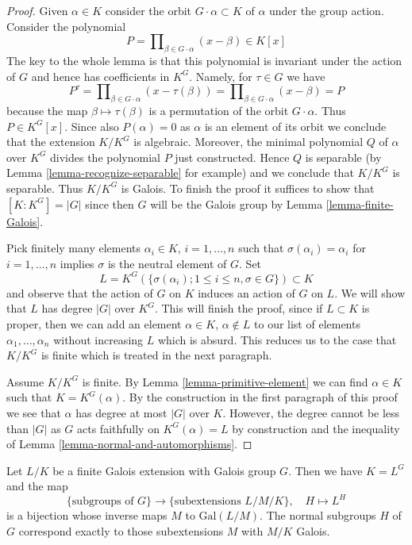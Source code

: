 \begin{proof}
Given $\alpha \in K$ consider the orbit $G \cdot \alpha \subset K$
of $\alpha$ under the group action. Consider the polynomial
$$
P = \prod\nolimits_{\beta \in G \cdot \alpha} (x - \beta) \in K[x]
$$
The key to the whole lemma is that this polynomial is invariant
under the action of $G$ and hence has coefficients in $K^G$.
Namely, for $\tau \in G$ we have
$$
P^\tau = \prod\nolimits_{\beta \in G \cdot \alpha} (x - \tau(\beta)) =
\prod\nolimits_{\beta \in G \cdot \alpha} (x - \beta) = P
$$
because the map $\beta \mapsto \tau(\beta)$ is a permutation of
the orbit $G \cdot \alpha$. Thus $P \in K^G[x]$. Since also
$P(\alpha) = 0$ as $\alpha$ is an element of its orbit
we conclude that the extension $K/K^G$ is algebraic. Moreover,
the minimal polynomial $Q$ of $\alpha$ over $K^G$ divides the
polynomial $P$ just constructed. Hence $Q$ is separable
(by Lemma \ref{lemma-recognize-separable} for example) and
we conclude that $K/K^G$ is separable. Thus $K/K^G$ is Galois.
To finish the proof it suffices to show that $[K : K^G] = |G|$
since then $G$ will be the Galois group by
Lemma \ref{lemma-finite-Galois}.

\medskip\noindent
Pick finitely many elements $\alpha_i \in K$, $i = 1, \ldots, n$
such that $\sigma(\alpha_i) = \alpha_i$ for $i = 1, \ldots, n$ implies
$\sigma$ is the neutral element of $G$. Set
$$
L = K^G(\{\sigma(\alpha_i); 1 \leq i \leq n, \sigma \in G\}) \subset K
$$
and observe that the action of $G$ on $K$ induces an action of $G$ on $L$.
We will show that $L$ has degree $|G|$ over $K^G$. This will finish the
proof, since if $L \subset K$ is proper, then we can add an element
$\alpha \in K$, $\alpha \not \in L$ to our list of elements
$\alpha_1, \ldots, \alpha_n$ without increasing $L$ which is absurd.
This reduces us to the case that $K/K^G$ is finite which is
treated in the next paragraph.

\medskip\noindent
Assume $K/K^G$ is finite. By Lemma \ref{lemma-primitive-element}
we can find $\alpha \in K$ such that $K = K^G(\alpha)$.
By the construction in the first paragraph of this proof we see
that $\alpha$ has degree at most $|G|$ over $K$. However, the
degree cannot be less than $|G|$ as $G$ acts faithfully on
$K^G(\alpha) = L$ by construction and the inequality of
Lemma \ref{lemma-normal-and-automorphisms}.
\end{proof}

\begin{theorem}
\label{theorem-galois-theory}
Let $L/K$ be a finite Galois extension with Galois group $G$.
Then we have $K = L^G$ and the map
$$
\{\text{subgroups of }G\}
\longrightarrow
\{\text{subextensions }L/M/K\},\quad
H \longmapsto L^H
$$
is a bijection whose inverse maps $M$ to $\text{Gal}(L/M)$.
The normal subgroups $H$ of $G$ correspond exactly to those
subextensions $M$ with $M/K$ Galois.
\end{theorem}

